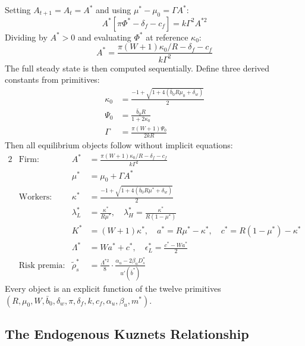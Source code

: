 \documentclass[12pt,a4paper]{article}
\begin{document}
Setting $A_{t+1} = A_t = A^*$ and using $\mu^*-\mu_0 = \Gamma A^*$:
\begin{equation}
  A^*[\pi\Phi^* - \delta_f - c_f] = k\Gamma^2 A^{*2}
  \label{eq:ss_eq}
\end{equation}
Dividing by $A^* > 0$ and evaluating $\Phi^*$ at reference $\kappa_0$:
\begin{equation}
  \boxed{A^* = \frac{\pi(W+1)\kappa_0/R - \delta_f - c_f}{k\Gamma^2}}
  \label{eq:Astar}
\end{equation}
The full steady state is then computed sequentially. Define three
derived constants from primitives:
\begin{align}
  \kappa_0 &= \frac{-1+\sqrt{1+4(\bar{b}_0 R\mu_0+\delta_w)}}{2}
  \label{eq:k0} \\[4pt]
  \Psi_0 &= \frac{\bar{b}_0 R}{1+2\kappa_0}
  \label{eq:Psi0} \\[4pt]
  \Gamma &= \frac{\pi(W+1)\Psi_0}{2kR}
  \label{eq:Gamma}
\end{align}
Then all equilibrium objects follow without implicit equations:
\begin{alignat}{2}
  &\text{Firm:}\quad
  &A^* &= \frac{\pi(W+1)\kappa_0/R - \delta_f - c_f}{k\Gamma^2}
  \label{eq:Astar2} \\[4pt]
  &&\mu^* &= \mu_0 + \Gamma A^*
  \label{eq:mustar} \\[8pt]
  &\text{Workers:}\quad
  &\kappa^* &= \frac{-1+\sqrt{1+4(\bar{b}_0 R\mu^*+\delta_w)}}{2}
  \label{eq:kstar} \\[4pt]
  &&\lambda_L^* &= \frac{\kappa^*}{R\mu^*},\quad
  \lambda_H^* = \frac{\kappa^*}{R(1-\mu^*)}
  \label{eq:lambdas} \\[4pt]
  &&K^* &= (W+1)\kappa^*, \quad
  a^* = R\mu^*-\kappa^*, \quad
  c^* = R(1-\mu^*)-\kappa^*
  \label{eq:Kacss} \\[4pt]
  &&\Lambda^* &= Wa^*+c^*, \quad
  \epsilon_L^* = \tfrac{c^*-Wa^*}{2}
  \label{eq:Lamss} \\[8pt]
  &\text{Risk premia:}\quad
  &\tilde\rho_s^* &= \frac{\Lambda^{*2}}{8}\cdot
  \frac{\alpha_u - 2\beta_u D_s^*}{u'(\bar{b}^*)}
  \label{eq:rhostar}
\end{alignat}
Every object is an explicit function of the twelve primitives
$(R,\mu_0,W,\bar{b}_0,\delta_w,\pi,\delta_f,k,c_f,\alpha_u,\beta_u,m^*)$.

\subsection{The Endogenous Kuznets Relationship}
\end{document}
